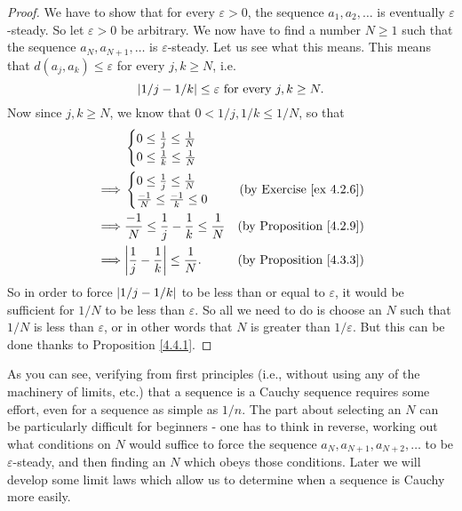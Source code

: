 \begin{proof}
    We have to show that for every \(\varepsilon > 0\), the sequence \(a_1, a_2, \dots\) is eventually \(\varepsilon\)-steady.
    So let \(\varepsilon > 0\) be arbitrary.
    We now have to find a number \(N \geq 1\) such that the sequence \(a_N, a_{N + 1}, \dots\) is \(\varepsilon\)-steady.
    Let us see what this means.
    This means that \(d(a_j, a_k) \leq \varepsilon\) for every \(j, k \geq N\), i.e.
    \[
        \left\lvert1 / j - 1 / k\right\rvert \leq \varepsilon \text{ for every } j, k \geq N.
    \]
    Now since \(j, k \geq N\), we know that \(0 < 1 / j, 1 / k \leq 1 / N\), so that
    \begin{align*}
                 &
        \begin{cases}
            0 \leq \frac{1}{j} \leq \frac{1}{N} \\
            0 \leq \frac{1}{k} \leq \frac{1}{N} \\
        \end{cases}
        \\
        \implies &
        \begin{cases}
            0 \leq \frac{1}{j} \leq \frac{1}{N}   \\
            \frac{-1}{N} \leq \frac{-1}{k} \leq 0 \\
        \end{cases}
                 & \text{(by Exercise \ref{ex 4.2.6})}                                                                \\
        \implies & \frac{-1}{N} \leq \frac{1}{j} - \frac{1}{k} \leq \frac{1}{N} & \text{(by Proposition \ref{4.2.9})} \\
        \implies & \abs{\frac{1}{j} - \frac{1}{k}} \leq \frac{1}{N}.            & \text{(by Proposition \ref{4.3.3})}
    \end{align*}
    So in order to force \(\left\lvert1 / j - 1 / k\right\rvert\) to be less than or equal to \(\varepsilon\), it would be sufficient for \(1 / N\) to be less than \(\varepsilon\).
    So all we need to do is choose an \(N\) such that \(1 / N\) is less than \(\varepsilon\), or in other words that \(N\) is greater than \(1 / \varepsilon\).
    But this can be done thanks to Proposition \ref{4.4.1}.
\end{proof}

\begin{note}
    As you can see, verifying from first principles (i.e., without using any of the machinery of limits, etc.) that a sequence is a Cauchy sequence requires some effort, even for a sequence as simple as \(1 / n\).
    The part about selecting an \(N\) can be particularly difficult for beginners
    - one has to think in reverse, working out what conditions on \(N\) would suffice to force the sequence \(a_N, a_{N + 1}, a_{N + 2}, \dots\) to be \(\varepsilon\)-steady, and then finding an \(N\) which obeys those conditions.
    Later we will develop some limit laws which allow us to determine when a sequence is Cauchy more easily.
\end{note}

